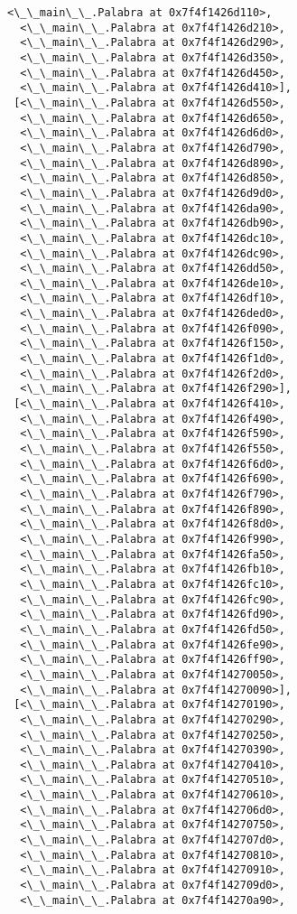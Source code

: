 \documentclass[12pt,a4paper,table]{article}
\begin{document}
\begin{tcolorbox}[breakable, size=fbox, boxrule=.5pt, pad at break*=1mm, opacityfill=0]
\begin{Verbatim}[commandchars=\\\{\}]
  <\_\_main\_\_.Palabra at 0x7f4f1426d110>,
  <\_\_main\_\_.Palabra at 0x7f4f1426d210>,
  <\_\_main\_\_.Palabra at 0x7f4f1426d290>,
  <\_\_main\_\_.Palabra at 0x7f4f1426d350>,
  <\_\_main\_\_.Palabra at 0x7f4f1426d450>,
  <\_\_main\_\_.Palabra at 0x7f4f1426d410>],
 [<\_\_main\_\_.Palabra at 0x7f4f1426d550>,
  <\_\_main\_\_.Palabra at 0x7f4f1426d650>,
  <\_\_main\_\_.Palabra at 0x7f4f1426d6d0>,
  <\_\_main\_\_.Palabra at 0x7f4f1426d790>,
  <\_\_main\_\_.Palabra at 0x7f4f1426d890>,
  <\_\_main\_\_.Palabra at 0x7f4f1426d850>,
  <\_\_main\_\_.Palabra at 0x7f4f1426d9d0>,
  <\_\_main\_\_.Palabra at 0x7f4f1426da90>,
  <\_\_main\_\_.Palabra at 0x7f4f1426db90>,
  <\_\_main\_\_.Palabra at 0x7f4f1426dc10>,
  <\_\_main\_\_.Palabra at 0x7f4f1426dc90>,
  <\_\_main\_\_.Palabra at 0x7f4f1426dd50>,
  <\_\_main\_\_.Palabra at 0x7f4f1426de10>,
  <\_\_main\_\_.Palabra at 0x7f4f1426df10>,
  <\_\_main\_\_.Palabra at 0x7f4f1426ded0>,
  <\_\_main\_\_.Palabra at 0x7f4f1426f090>,
  <\_\_main\_\_.Palabra at 0x7f4f1426f150>,
  <\_\_main\_\_.Palabra at 0x7f4f1426f1d0>,
  <\_\_main\_\_.Palabra at 0x7f4f1426f2d0>,
  <\_\_main\_\_.Palabra at 0x7f4f1426f290>],
 [<\_\_main\_\_.Palabra at 0x7f4f1426f410>,
  <\_\_main\_\_.Palabra at 0x7f4f1426f490>,
  <\_\_main\_\_.Palabra at 0x7f4f1426f590>,
  <\_\_main\_\_.Palabra at 0x7f4f1426f550>,
  <\_\_main\_\_.Palabra at 0x7f4f1426f6d0>,
  <\_\_main\_\_.Palabra at 0x7f4f1426f690>,
  <\_\_main\_\_.Palabra at 0x7f4f1426f790>,
  <\_\_main\_\_.Palabra at 0x7f4f1426f890>,
  <\_\_main\_\_.Palabra at 0x7f4f1426f8d0>,
  <\_\_main\_\_.Palabra at 0x7f4f1426f990>,
  <\_\_main\_\_.Palabra at 0x7f4f1426fa50>,
  <\_\_main\_\_.Palabra at 0x7f4f1426fb10>,
  <\_\_main\_\_.Palabra at 0x7f4f1426fc10>,
  <\_\_main\_\_.Palabra at 0x7f4f1426fc90>,
  <\_\_main\_\_.Palabra at 0x7f4f1426fd90>,
  <\_\_main\_\_.Palabra at 0x7f4f1426fd50>,
  <\_\_main\_\_.Palabra at 0x7f4f1426fe90>,
  <\_\_main\_\_.Palabra at 0x7f4f1426ff90>,
  <\_\_main\_\_.Palabra at 0x7f4f14270050>,
  <\_\_main\_\_.Palabra at 0x7f4f14270090>],
 [<\_\_main\_\_.Palabra at 0x7f4f14270190>,
  <\_\_main\_\_.Palabra at 0x7f4f14270290>,
  <\_\_main\_\_.Palabra at 0x7f4f14270250>,
  <\_\_main\_\_.Palabra at 0x7f4f14270390>,
  <\_\_main\_\_.Palabra at 0x7f4f14270410>,
  <\_\_main\_\_.Palabra at 0x7f4f14270510>,
  <\_\_main\_\_.Palabra at 0x7f4f14270610>,
  <\_\_main\_\_.Palabra at 0x7f4f142706d0>,
  <\_\_main\_\_.Palabra at 0x7f4f14270750>,
  <\_\_main\_\_.Palabra at 0x7f4f142707d0>,
  <\_\_main\_\_.Palabra at 0x7f4f14270810>,
  <\_\_main\_\_.Palabra at 0x7f4f14270910>,
  <\_\_main\_\_.Palabra at 0x7f4f142709d0>,
  <\_\_main\_\_.Palabra at 0x7f4f14270a90>,

\end{Verbatim}
\end{tcolorbox}
\end{document}
